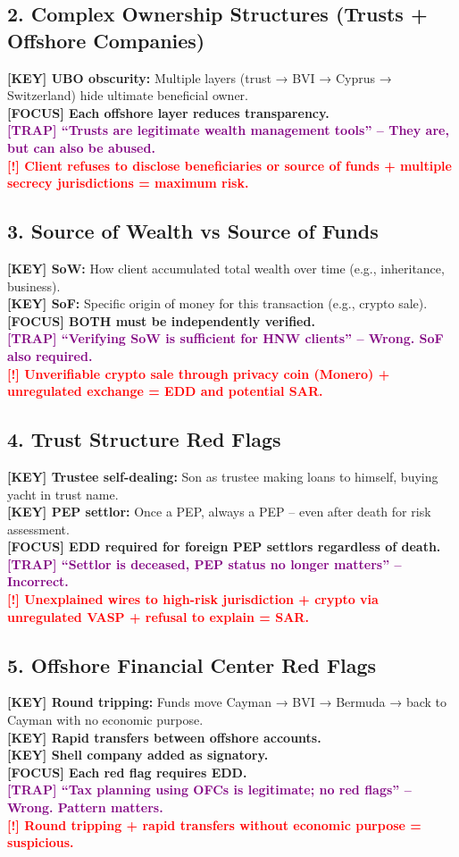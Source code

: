 \documentclass[10pt,a4paper]{article}
\newcommand{\redflag}[1]{\textcolor{red}{\textbf{[!] #1}}}
\newcommand{\examfocus}[1]{\textcolor{orange!80!black}{\textbf{[FOCUS] #1}}}
\newcommand{\trap}[1]{\textcolor{purple}{\textbf{[TRAP] #1}}}
\newcommand{\keyterm}[1]{\textcolor{red!80!black}{\textbf{[KEY] #1}}}
\begin{document}
\subsection*{2. Complex Ownership Structures (Trusts + Offshore Companies)}
\keyterm{UBO obscurity:} Multiple layers (trust → BVI → Cyprus → Switzerland) hide ultimate beneficial owner. \\
\examfocus{Each offshore layer reduces transparency.} \\
\trap{“Trusts are legitimate wealth management tools” – They are, but can also be abused.} \\
\redflag{Client refuses to disclose beneficiaries or source of funds + multiple secrecy jurisdictions = maximum risk.}

\subsection*{3. Source of Wealth vs Source of Funds}
\keyterm{SoW:} How client accumulated total wealth over time (e.g., inheritance, business). \\
\keyterm{SoF:} Specific origin of money for this transaction (e.g., crypto sale). \\
\examfocus{BOTH must be independently verified.} \\
\trap{“Verifying SoW is sufficient for HNW clients” – Wrong. SoF also required.} \\
\redflag{Unverifiable crypto sale through privacy coin (Monero) + unregulated exchange = EDD and potential SAR.}

\subsection*{4. Trust Structure Red Flags}
\keyterm{Trustee self-dealing:} Son as trustee making loans to himself, buying yacht in trust name. \\
\keyterm{PEP settlor:} Once a PEP, always a PEP – even after death for risk assessment. \\
\examfocus{EDD required for foreign PEP settlors regardless of death.} \\
\trap{“Settlor is deceased, PEP status no longer matters” – Incorrect.} \\
\redflag{Unexplained wires to high-risk jurisdiction + crypto via unregulated VASP + refusal to explain = SAR.}

\subsection*{5. Offshore Financial Center Red Flags}
\keyterm{Round tripping:} Funds move Cayman → BVI → Bermuda → back to Cayman with no economic purpose. \\
\keyterm{Rapid transfers between offshore accounts.} \\
\keyterm{Shell company added as signatory.} \\
\examfocus{Each red flag requires EDD.} \\
\trap{“Tax planning using OFCs is legitimate; no red flags” – Wrong. Pattern matters.} \\
\redflag{Round tripping + rapid transfers without economic purpose = suspicious.}
\end{document}
